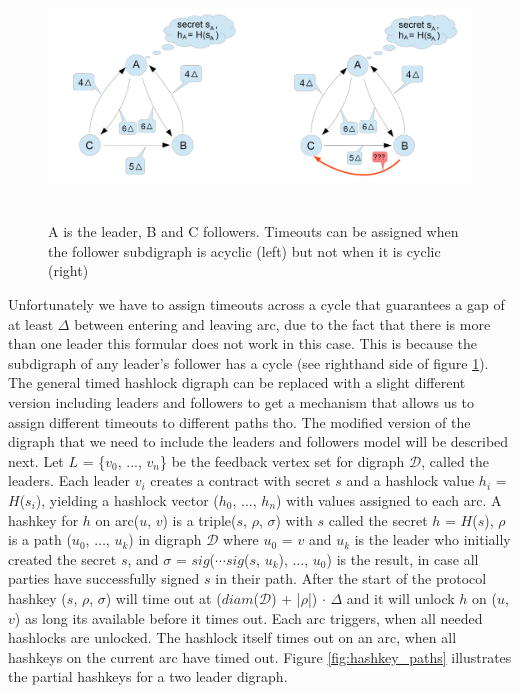 
\begin{figure}[h]
	\includegraphics[height=6.5cm]{timeouts_subdigraph}	%
	\caption{A is the leader, B and C followers. Timeouts can be assigned when the follower subdigraph is acyclic (left) but not when it is cyclic (right)}
	\label{fig:timeouts_subdigraph}
\end{figure}

Unfortunately we have to assign timeouts across a cycle that guarantees a gap of at least $\Delta$ between entering and leaving arc, due to the fact that there is more than one leader this formular does not work in this case. This is because the subdigraph of any leader's follower has a cycle (see righthand side of figure \ref{fig:timeouts_subdigraph}). The general timed hashlock digraph can be replaced with a slight different version including leaders and followers to get a mechanism that allows us to assign different timeouts to different paths tho. The modified version of the digraph that we need to include the leaders and followers model will be described next. Let $L$ = \{$v_0$, ..., $v_n$\} be the feedback vertex set for digraph $\mathcal{D}$, called the leaders. Each leader $v_i$ creates a contract with secret $s$ and a hashlock value $h_i$ = $H$($s_i$), yielding a hashlock vector ($h_0$, $\dots$, $h_n$) with values assigned to each arc. A hashkey for $h$ on arc($u$, $v$) is a triple($s$, $\rho$, $\sigma$) with $s$ called the secret $h$ = $H$($s$), $\rho$ is a path ($u_0$, $\dots$, $u_k$) in digraph $\mathcal{D}$ where $u_0$ = $v$ and $u_k$ is the leader who initially created the secret $s$, and $\sigma$ = $sig$($\cdots$$sig$($s$, $u_k$), $\dots$, $u_0$) is the result, in case all parties have successfully signed $s$ in their path. After the start of the protocol hashkey ($s$, $\rho$, $\sigma$) will time out at ($diam$($\mathcal{D}$) + |$\rho$|) $\cdot$ $\Delta$ and it will unlock $h$ on ($u$, $v$) as long its available before it times out. Each arc triggers, when all needed hashlocks are unlocked. The hashlock itself times out on an arc, when all hashkeys on the current arc have timed out. Figure \ref{fig:hashkey_paths} illustrates the partial hashkeys for a two leader digraph.

